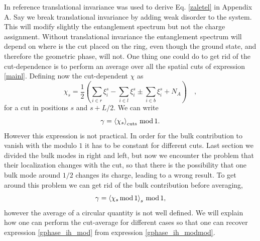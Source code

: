 \documentclass[twocolumn,amsmath,longbibliography,amssymb,superscriptaddress]{revtex4-1}
\begin{document}
In reference \cite{Zaletel2014} translational invariance was used to derive Eq. \ref{zaletel} in Appendix A. Say we break translational invariance by adding weak disorder to the system. This will modify slightly the entanglement spectrum but not the charge assignment. Without translational invariance the entanglement spectrum will depend on where is the cut placed on the ring, even though the ground state, and therefore the geometric phase, will not. One thing one could do to get rid of the cut-dependence is to perform an average over all the spatial cuts of expression \ref{mainl}. Defining now the cut-dependent $\chi$ as 
\begin{equation*}
\chi_s = \frac{1}{2} \left( \sum_{i\in r}\xi^s_i-\sum_{i\in l}\xi^s_i \pm \sum_{i\in b}\xi^s_i  + N_A \right) \quad,
\end{equation*}
for a cut in positions $s$ and $s+L/2$. We can write
\begin{equation}
\gamma = \expval{\chi_s}_{\rm cuts} \, {\rm mod}\, 1.
\label{gphase_ih_mod}
\end{equation}
However this expression is not practical. In order for the bulk contribution to vanish with the modulo $1$ it has to be constant for different cuts. Last section we divided the bulk modes in right and left, but now we encounter the problem that their localization changes with the cut, so that there is the possibility that one bulk mode around $1/2$ changes its charge, leading to a wrong result. To get around this problem we can get rid of the bulk contribution before averaging,
\begin{equation}
\gamma = \expval{\chi_s \, {\rm mod}\, 1}_s \, {\rm mod}\, 1,
\label{gphase_ih_modmod}
\end{equation}
however the average of a circular quantity is not well defined. We will explain how one can perform the cut-average for different cases so that one can recover expression \ref{gphase_ih_mod} from expression \ref{gphase_ih_modmod}.
\end{document}
